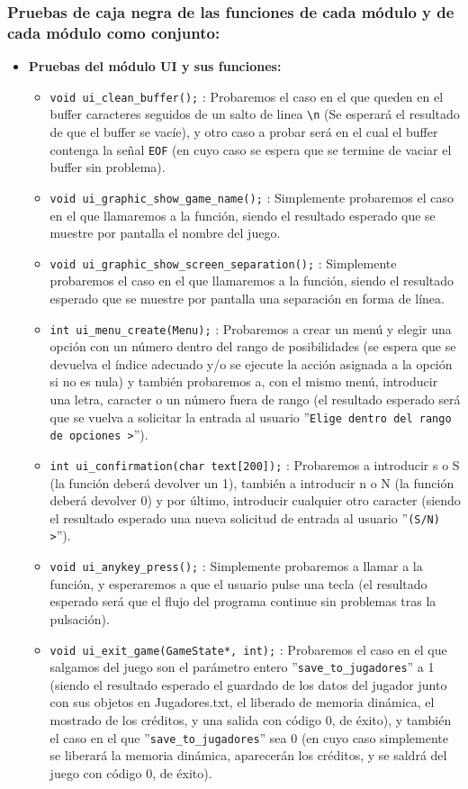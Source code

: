 \subsubsection{Pruebas de caja negra de las funciones de cada módulo y de cada módulo como conjunto:}

	\begin{itemize}

		\item \textbf{Pruebas del módulo UI y sus funciones:}
		\begin{itemize}
			\item \verb|void ui_clean_buffer();| : Probaremos el caso en el que queden en el buffer caracteres seguidos de un salto de linea \verb|\n| (Se esperará el resultado de que el buffer se vacíe), y otro caso a probar será en el cual el buffer contenga la señal \verb|EOF| (en cuyo caso se espera que se termine de vaciar el buffer sin problema).
			\item \verb|void ui_graphic_show_game_name();| : Simplemente probaremos el caso en el que llamaremos a la función, siendo el resultado esperado que se muestre por pantalla el nombre del juego.
			\item \verb|void ui_graphic_show_screen_separation();| : Simplemente probaremos el caso en el que llamaremos a la función, siendo el resultado esperado que se muestre por pantalla una separación en forma de línea.
			\item \verb|int ui_menu_create(Menu);| : Probaremos a crear un menú y elegir una opción con un número dentro del rango de posibilidades (se espera que se devuelva el índice adecuado y/o se ejecute la acción asignada a la opción si no es nula) y también probaremos a, con el mismo menú, introducir una letra, caracter o un número fuera de rango (el resultado esperado será que se vuelva a solicitar la entrada al usuario ''\verb|Elige dentro del rango de opciones >|'').
			\item \verb|int ui_confirmation(char text[200]);| : Probaremos a introducir s o S (la función deberá devolver un 1), también a introducir n o N (la función deberá devolver 0) y por último, introducir cualquier otro caracter (siendo el resultado esperado una nueva solicitud de entrada al usuario ''\verb|(S/N) >|'').
			\item \verb|void ui_anykey_press();| : Simplemente probaremos a llamar a la función, y esperaremos a que el usuario pulse una tecla (el resultado esperado será que el flujo del programa continue sin problemas tras la pulsación).
			\item \verb|void ui_exit_game(GameState*, int);| : Probaremos el caso en el que salgamos del juego son el parámetro entero ''\verb|save_to_jugadores|'' a 1 (siendo el resultado esperado el guardado de los datos del jugador junto con sus objetos en Jugadores.txt, el liberado de memoria dinámica, el mostrado de los créditos, y una salida con código 0, de éxito), y también el caso en el que ''\verb|save_to_jugadores|'' sea 0 (en cuyo caso simplemente se liberará la memoria dinámica, aparecerán los créditos, y se saldrá del juego con código 0, de éxito).

\end{itemize}
\end{itemize}
